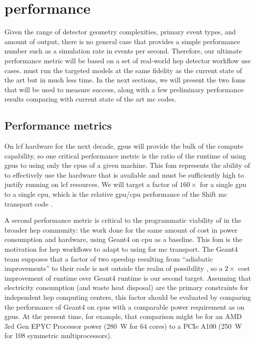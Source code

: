 \section{\celeritas performance}

Given the range of detector geometry complexities, primary event types, and
amount of output, there is no general case that provides a simple performance
number such as a simulation rate in events per second. Therefore, our ultimate
performance metric will be based on a set of real-world \acs{hep} detector
workflow use cases. \celeritas must run the targeted models at the same fidelity
as the current state of the art but in much less time. In the next sections,  we
will present the two \acp{fom} that will be used to measure success, along with
a few preliminary performance results comparing \celeritas with current state of
the art \ac{mc} codes.

\subsection{Performance metrics}

On \ac{lcf} hardware for the next decade, \acp{gpu} will provide the bulk of the
compute capability, so one critical performance metric is the ratio of the
runtime of \celeritas using \acp{gpu} to using only the \acp{cpu} of a given
machine. This \ac{fom} represents the ability of \celeritas to effectively use
the hardware that is available and must be sufficiently high to justify running
on \ac{lcf} resources. We will target a factor of $160\times$ for a single
\ac{gpu} to a single \ac{cpu}, which is the relative \ac{gpu}/\ac{cpu}
performance of the Shift \ac{mc} transport code
\cite{hamilton_continuous-energy_2019}.

A second performance metric is critical to the programmatic viability of
\celeritas in the broader \ac{hep} community: the work done for the same amount
of cost in power consumption and hardware, using Geant4 on \ac{cpu} as a
baseline. This \ac{fom} is the motivation for \ac{hep} workflows to adapt to
using \celeritas for \ac{mc} transport. The Geant4 team supposes that a factor
of two speedup resulting from ``adiabatic improvements'' to their code is not
outside the realm of possibility \cite{marc_verderi_geant4_2021}, so a $2
\times$ cost improvement of \celeritas runtime over Geant4 runtime is our second
target. Assuming that electricity consumption (and waste heat disposal) are the
primary constraints for independent \ac{hep} computing centers, this factor
should be evaluated by comparing the performance of Geant4 on \acp{cpu} with a
comparable power requirement as \celeritas on \acp{gpu}. At the present time,
for example, that comparison might be for an AMD 3rd Gen EPYC Processor power
(\SI{280}{\watt} for 64 cores) to a PCIe \nvidia A100 (\SI{250}{\watt} for 108
symmetric multiprocessors).

